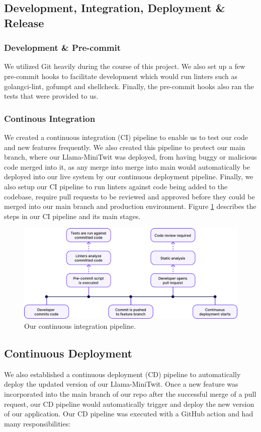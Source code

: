 \documentclass{article}
\begin{document}
\subsection{Development, Integration, Deployment {\&} Release}
\subsubsection{Development {\&} Pre-commit}
We utilized Git heavily during the course of this project. We also set up a few pre-commit hooks to facilitate development which would run linters such as golangci-lint, gofumpt and shellcheck. Finally, the pre-commit hooks also ran the tests that were provided to us.


\subsubsection{Continous Integration}
We created a continuous integration (CI) pipeline to enable us to test our code and new features frequently. We also created this pipeline to protect our main branch, where our Llama-MiniTwit was deployed, from having buggy or malicious code merged into it, as any merge into merge into main would automatically be deployed into our live system by our continuous deployment pipeline. Finally, we also setup our CI pipeline to run linters against code being added to the codebase, require pull requests to be reviewed and approved before they could be merged into our main branch and production environment. Figure \ref{fig:ci_pipeline} describes the steps in our CI pipeline and its main stages.

\begin{figure}[ht]
    \centering
    \includegraphics[width=1.0\textwidth]{./images/CI_pipline_V2.png} 
    \caption{Our continuous integration pipeline.}
    \label{fig:ci_pipeline}
\end{figure}

\subsection{Continuous Deployment}
We also established a continuous deployment (CD) pipeline to automatically deploy the updated version of our Llama-MiniTwit. Once a new feature was incorporated into the main branch of our repo after the successful merge of a pull request, our CD pipeline would automatically trigger and deploy the new version of our application. Our CD pipeline was executed with a GitHub action and had many responsibilities:
\end{document}
